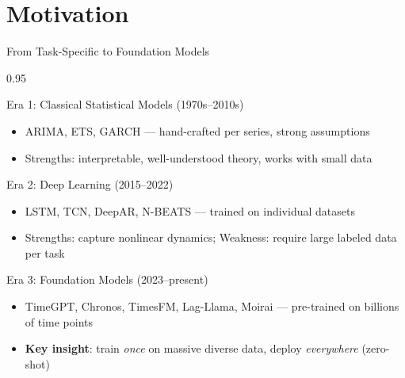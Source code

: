 \documentclass[9pt, aspectratio=169, t]{beamer}
\begin{document}
\section{Motivation}

\begin{frame}{From Task-Specific to Foundation Models}
    \begin{cminipage}{0.95\textwidth}
    \vspace{-2mm}
    \begin{block}{Era 1: Classical Statistical Models (1970s--2010s)}
        \begin{itemize}\setlength{\itemsep}{0pt}
            \item ARIMA, ETS, GARCH --- hand-crafted per series, strong assumptions
            \item Strengths: interpretable, well-understood theory, works with small data
        \end{itemize}
    \end{block}
    \vspace{-2mm}
    \begin{alertblock}{Era 2: Deep Learning (2015--2022)}
        \begin{itemize}\setlength{\itemsep}{0pt}
            \item LSTM, TCN, DeepAR, N-BEATS --- trained on individual datasets
            \item Strengths: capture nonlinear dynamics; Weakness: require large labeled data per task
        \end{itemize}
    \end{alertblock}
    \vspace{-2mm}
    \begin{exampleblock}{Era 3: Foundation Models (2023--present)}
        \begin{itemize}\setlength{\itemsep}{0pt}
            \item TimeGPT, Chronos, TimesFM, Lag-Llama, Moirai --- pre-trained on billions of time points
            \item \textbf{Key insight}: train \textit{once} on massive diverse data, deploy \textit{everywhere} (zero-shot)
        \end{itemize}
    \end{exampleblock}
    \end{cminipage}
\end{frame}
\end{document}
